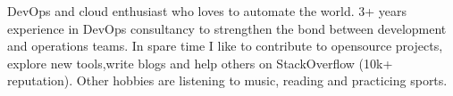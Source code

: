 

\begin{cvparagraph}

DevOps and cloud enthusiast who loves to automate the world. 3+ years experience in DevOps consultancy to strengthen the bond between development and operations teams. 
In spare time I like to contribute to opensource projects, explore new tools,write blogs and help others on StackOverflow (10k+ reputation). 
Other hobbies are listening to music, reading and practicing sports.

\end{cvparagraph}
